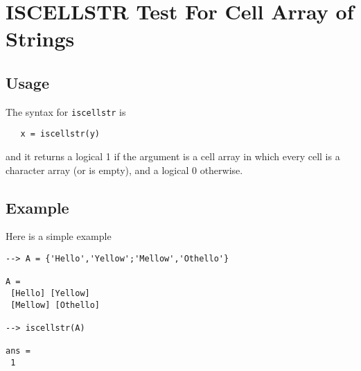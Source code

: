 \section{ISCELLSTR Test For Cell Array of Strings}

\subsection{Usage}

The syntax for \verb|iscellstr| is 
\begin{verbatim}
   x = iscellstr(y)
\end{verbatim}
and it returns a logical 1 if the argument is a cell array
in which every cell is a character array (or is empty), and
a logical 0 otherwise.
\subsection{Example}

Here is a simple example
\begin{verbatim}
--> A = {'Hello','Yellow';'Mellow','Othello'}

A = 
 [Hello] [Yellow] 
 [Mellow] [Othello] 

--> iscellstr(A)

ans = 
 1 
\end{verbatim}
